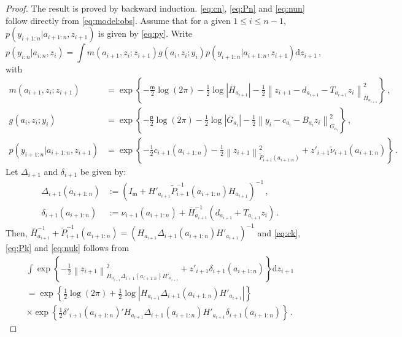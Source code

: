 \documentclass[nolayout]{article}
\theoremstyle{plain}
\theoremstyle{definition}
\newcommand{\1}{\mathbbm{1}}
\def\rmd{\mathrm{d}}
\def\dimy{\mathsf{p}}
\def\dimz{\mathsf{m}}
\def\barG{\overline{G}}
\def\barH{\overline{H}}
\def\eqsp{\,}
\newcommand{\normMat}[2]{\left\|#2\right\|_{#1}}
\newcommand{\eqdef}{\ensuremath{:=}}
\begin{document}
\begin{proof}
The result is proved by backward induction. \eqref{eq:cn}, \eqref{eq:Pn} and \eqref{eq:nun} follow directly from \eqref{eq:model:obs}. Assume that for a given $1\le i\le n-1$, $p(y_{i+1:n}|a_{i+1:n},z_{i+1})$ is given by \eqref{eq:py}. Write
\[
p(y_{i:n}|a_{i:n},z_i) = \int m(a_{i+1},z_i;z_{i+1})g(a_i,z_i;y_i)p(y_{i+1:n}|a_{i+1:n},z_{i+1})\rmd z_{i+1}\eqsp,
\]
with
\begin{align*}
m(a_{i+1},z_i;z_{i+1}) &= \exp\left\{-\frac{\dimz}{2}\log(2\pi)-\frac{1}{2}\log|\barH_{a_{i+1}}|-\frac{1}{2}\normMat{\barH_{a_{i+1}}}{z_{i+1}-d_{a_{i+1}}-T_{a_{i+1}}z_i}^2\right\}\eqsp,\\
g(a_i,z_i;y_i)& = \exp\left\{-\frac{\dimy}{2}\log(2\pi)-\frac{1}{2}\log|\barG_{a_i}|-\frac{1}{2}\normMat{\barG_{a_i}}{y_{i}-c_{a_{i}}-B_{a_i}z_i}^2\right\}\eqsp,\\
p(y_{i+1:n}|a_{i+1:n},z_{i+1})& = \exp\left\{-\frac{1}{2}c_{i+1}(a_{i+1:n}) - \frac{1}{2}\normMat{\tilde{P}_{i+1}(a_{i+1:n})}{z_{i+1}}^2 + z'_{i+1}\tilde{\nu}_{i+1}(a_{i+1:n})\right\}\eqsp.
\end{align*}
Let $\Delta_{i+1}$ and  $\delta_{i+1}$ be given by:
\begin{align*}
\Delta_{i+1}(a_{i+1:n}) &\eqdef \left(I_{\dimz} + H'_{a_{i+1}}\tilde{P}_{i+1}^{-1}(a_{i+1:n})H_{a_{i+1}}\right)^{-1}\eqsp,\\
\delta_{i+1}(a_{i+1:n}) &\eqdef \nu_{i+1}(a_{i+1:n}) + \barH_{a_{i+1}}^{-1}(d_{a_{i+1}}+T_{a_{i+1}}z_i)\eqsp.
\end{align*}
Then, $\barH_{a_{i+1}}^{-1} + \tilde{P}_{i+1}^{-1}(a_{i+1:n}) = \left(H_{a_{i+1}}\Delta_{i+1}(a_{i+1:n})H'_{a_{i+1}}\right)^{-1}$ and \eqref{eq:ck}, \eqref{eq:Pk} and \eqref{eq:nuk} follows from
\begin{multline*}
\int \exp\left\{-\frac{1}{2}\normMat{H_{a_{i+1}}\Delta_{i+1}(a_{i+1:n})H'_{a_{i+1}}}{z_{i+1}}^2 + z'_{i+1}\delta_{i+1}(a_{i+1:n})\right\}\rmd z_{i+1} \\
=\exp\left\{\frac{1}{2}\log(2\pi) + \frac{1}{2}\log|H_{a_{i+1}}\Delta_{i+1}(a_{i+1:n})H'_{a_{i+1}}|\right\}\\
\times\exp\left\{\frac{1}{2}\delta'_{i+1}(a_{i+1:n})'H_{a_{i+1}}\Delta_{i+1}(a_{i+1:n})H'_{a_{i+1}}\delta_{i+1}(a_{i+1:n})\right\}\eqsp.
\end{multline*}
\end{proof}
\end{document}
